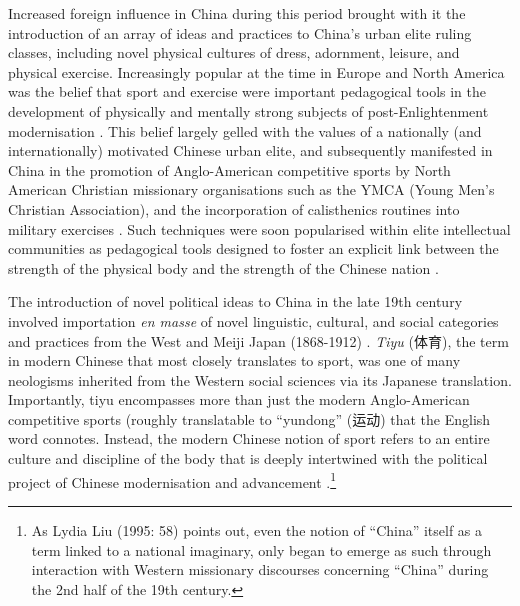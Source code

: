 {Increased foreign influence in China during this period brought with it the introduction of an array of ideas and practices to China's urban elite ruling classes, including novel physical cultures of dress, adornment, leisure, and physical exercise.  Increasingly popular at the time in Europe and North America was the belief that sport and exercise were important pedagogical tools in the development of physically and mentally strong subjects of post-Enlightenment modernisation \citep{Elias1986}.  This belief largely gelled with the values of a nationally (and internationally) motivated Chinese urban elite, and subsequently manifested in China in the promotion of Anglo-American competitive sports by North American Christian missionary organisations such as the YMCA (Young Men’s Christian Association), and the incorporation of calisthenics routines into military exercises \citep[240]{Morris2004}.  Such techniques were soon popularised within elite intellectual communities as pedagogical tools designed to foster an explicit link between the strength of the physical body and the strength of the Chinese nation \cites[32]{Morris2004}[49]{Brownell1995}.

The introduction of novel political ideas to China in the late 19th century involved importation \textit{en masse} of novel linguistic, cultural, and social categories and practices from the West and Meiji Japan (1868-1912) \citep{Liu1995}. \textit{Tiyu} (体育), the term in modern Chinese that most closely translates to sport, was one of many neologisms inherited from the Western social sciences via its Japanese translation.  Importantly, tiyu encompasses more than just the modern Anglo-American competitive sports (roughly translatable to ``yundong'' (运动) that the English word connotes.  Instead, the modern Chinese notion of sport refers to an entire culture and discipline of the body that is deeply intertwined with the political project of Chinese modernisation and advancement \citep{Morris2004}.\footnote{As Lydia Liu (1995: 58) points out, even the notion of ``China'' itself as a term linked to a national imaginary, only began to emerge as such through interaction with Western missionary discourses concerning ``China'' during the 2nd half of the 19th century.}

}
